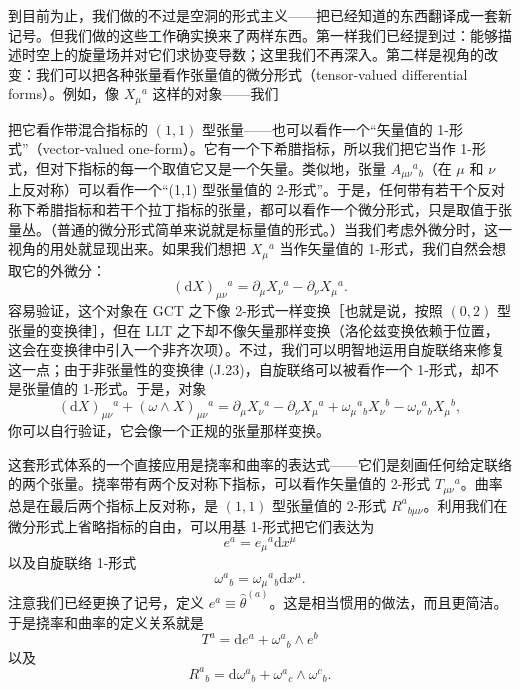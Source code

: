 到目前为止，我们做的不过是空洞的形式主义——把已经知道的东西翻译成一套新记号。但我们做的这些工作确实换来了两样东西。第一样我们已经提到过：能够描述时空上的旋量场并对它们求协变导数；这里我们不再深入。第二样是视角的改变：我们可以把各种张量看作张量值的微分形式（tensor-valued differential forms）。例如，像 $X_{\mu}{}^{a}$ 这样的对象——我们

把它看作带混合指标的 $(1,1)$ 型张量——也可以看作一个“矢量值的 1-形式”（vector-valued one-form）。它有一个下希腊指标，所以我们把它当作 1-形式，但对下指标的每一个取值它又是一个矢量。类似地，张量 $A_{\mu\nu}{}^{a}{}_{b}$（在 $\mu$ 和 $\nu$ 上反对称）可以看作一个“(1,1) 型张量值的 2-形式”。于是，任何带有若干个反对称下希腊指标和若干个拉丁指标的张量，都可以看作一个微分形式，只是取值于张量丛。（普通的微分形式简单来说就是标量值的形式。）当我们考虑外微分时，这一视角的用处就显现出来。如果我们想把 $X_{\mu}{}^{a}$ 当作矢量值的 1-形式，我们自然会想取它的外微分：
\begin{equation*}
(\mathrm{d}X)_{\mu\nu}{}^{a} = \partial_{\mu}X_{\nu}{}^{a} - \partial_{\nu}X_{\mu}{}^{a}.
\tag{J.24}
\end{equation*}
容易验证，这个对象在 GCT 之下像 2-形式一样变换［也就是说，按照 $(0,2)$ 型张量的变换律］，但在 LLT 之下却不像矢量那样变换（洛伦兹变换依赖于位置，这会在变换律中引入一个非齐次项）。不过，我们可以明智地运用自旋联络来修复这一点；由于非张量性的变换律 (J.23)，自旋联络可以被看作一个 1-形式，却不是张量值的 1-形式。于是，对象
\begin{equation*}
(\mathrm{d}X)_{\mu\nu}{}^{a} + (\omega\wedge X)_{\mu\nu}{}^{a} = \partial_{\mu}X_{\nu}{}^{a} - \partial_{\nu}X_{\mu}{}^{a} + \omega_{\mu}{}^{a}{}_{b}X_{\nu}{}^{b} - \omega_{\nu}{}^{a}{}_{b}X_{\mu}{}^{b},
\tag{J.25}
\end{equation*}
你可以自行验证，它会像一个正规的张量那样变换。

这套形式体系的一个直接应用是挠率和曲率的表达式——它们是刻画任何给定联络的两个张量。挠率带有两个反对称下指标，可以看作矢量值的 2-形式 $T_{\mu\nu}{}^{a}$。曲率总是在最后两个指标上反对称，是 $(1,1)$ 型张量值的 2-形式 $R^{a}{}_{b\mu\nu}$。利用我们在微分形式上省略指标的自由，可以用基 1-形式把它们表达为
\begin{equation*}
e^{a} = e_{\mu}{}^{a}\mathrm{d}x^{\mu}
\tag{J.26}
\end{equation*}
以及自旋联络 1-形式
\begin{equation*}
\omega^{a}{}_{b} = \omega_{\mu}{}^{a}{}_{b}\mathrm{d}x^{\mu}.
\tag{J.27}
\end{equation*}
注意我们已经更换了记号，定义 $e^{a} \equiv \hat{\theta}^{(a)}$。这是相当惯用的做法，而且更简洁。于是挠率和曲率的定义关系就是
\begin{equation*}
T^{a} = \mathrm{d}e^{a} + \omega^{a}{}_{b}\wedge e^{b}
\tag{J.28}
\end{equation*}
以及
\begin{equation*}
R^{a}{}_{b} = \mathrm{d}\omega^{a}{}_{b} + \omega^{a}{}_{c}\wedge\omega^{c}{}_{b}.
\tag{J.29}
\end{equation*}

